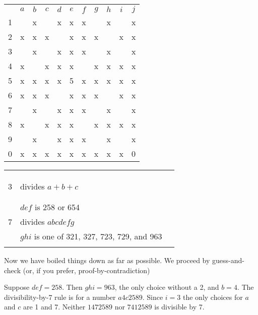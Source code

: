 \begin{center}
\begin{tabular}{ccccccccccc}
			&	$a$	&	$b$	&	$c$	&	$d$	&	$e$	&	$f$	&	$g$	&	$h$	&	$i$	&	$j$	\\
	1		&		&	x	&		&	x	&	x	&	x	&		&	x	&		&	x	\\
	2		&	x	&	x	&	x	&		&	x	&	x	&	x	&		&	x	&	x	\\
	3		&		&	x	&		&	x	&	x	&	x	&		&	x	&		&	x	\\
	4		&	x	&		&	x	&	x	&	x	&		&	x	&	x	&	x	&	x	\\
	5		&	x	&	x	&	x	&	x	&	5	&	x	&	x	&	x	&	x	&	x	\\
	6		&	x	&	x	&	x	&		&	x	&	x	&	x	&		&	x	&	x	\\
	7		&		&	x	&		&	x	&	x	&	x	&		&	x	&		&	x	\\
	8		&	x	&		&	x	&	x	&	x	&		&	x	&	x	&	x	&	x	\\
	9		&		&	x	&		&	x	&	x	&	x	&		&	x	&		&	x	\\
	0		&	x	&	x	&	x	&	x	&	x	&	x	&	x	&	x	&	x	&	0	\\
\end{tabular}
\hspace{1cm}\vline\hspace{1cm}
\begin{tabular}{rll}
	& 		\\
	& 		\\
	& 		\\
	3	&	divides $a+b+c$		\\
	& 		\\
	&		\\
	&	$def$ is 258 or 654		\\
	7	&	divides $abcdefg$	\\
		&	$ghi$ is one of 321, 327, 723, 729, and 963 \\
		&	
		&	
\end{tabular}
\end{center}

Now we have boiled things down as far as possible.  We proceed by guess-and-check (or, if you prefer, proof-by-contradiction)

Suppose $def=258$.  Then $ghi=963$, the only choice without a 2, and $b=4$.  The divisibility-by-7 rule is for a number $a4c2589$.  Since $i=3$ the only choices for $a$ and $c$ are 1 and 7.  Neither $1472589$ nor $7412589$ is divisible by 7. 


